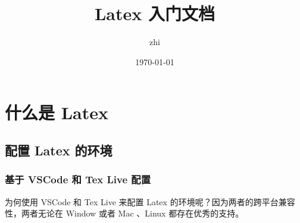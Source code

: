 \documentclass[UTF8]{ctexart}
\title{Latex 入门文档}
\author{zhi}
\date{\today}
\begin{document}
\tableofcontents
\maketitle
\section{什么是 Latex}
\subsection{配置 Latex 的环境}
\subsubsection{基于 VSCode 和 Tex Live 配置}
为何使用 VSCode 和 Tex Live 来配置 Latex 的环境呢？因为两者的跨平台兼容性，两者无论在 Window 或者 Mac 、Linux 都存在优秀的支持。
\end{document}
